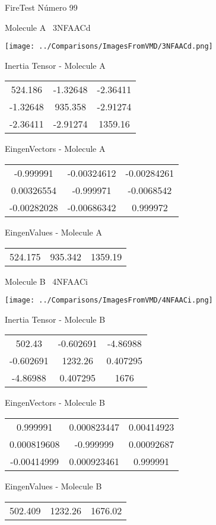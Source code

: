 \vtab[-3cm]
\begin{center}
{\large FireTest \tab Número 99}
\end{center}
\begin{multicols}{2}
\begin{center}

Molecule A \
3NFAACd

\texttt{[image: ../Comparisons/ImagesFromVMD/3NFAACd.png]}

Inertia Tensor - Molecule A \\
\begin{tabular}{|c c c|}
524.186	 & 	-1.32648	 & 	-2.36411	 \\
-1.32648	 & 	935.358	 & 	-2.91274	 \\
-2.36411	 & 	-2.91274	 & 	1359.16
\end{tabular}

\vtab
 EingenVectors - Molecule A     \\
\begin{tabular}{|c c c|}
-0.999991	 & 	-0.00324612	 & 	-0.00284261	 \\
0.00326554	 & 	-0.999971	 & 	-0.0068542	 \\
-0.00282028	 & 	-0.00686342	 & 	0.999972
\end{tabular}

\vtab
 EingenValues - Molecule A     \\
\begin{tabular}{|c c c|}
524.175	 & 	935.342	 & 	1359.19	 \\
\end{tabular}
\columnbreak

Molecule B \
4NFAACi

\texttt{[image: ../Comparisons/ImagesFromVMD/4NFAACi.png]}

Inertia Tensor - Molecule B \\
\begin{tabular}{|c c c|}
502.43	 & 	-0.602691	 & 	-4.86988	 \\
-0.602691	 & 	1232.26	 & 	0.407295	 \\
-4.86988	 & 	0.407295	 & 	1676
\end{tabular}

\vtab
 EingenVectors - Molecule B     \\
\begin{tabular}{|c c c|}
0.999991	 & 	0.000823447	 & 	0.00414923	 \\
0.000819608	 & 	-0.999999	 & 	0.00092687	 \\
-0.00414999	 & 	0.000923461	 & 	0.999991
\end{tabular}

\vtab
 EingenValues - Molecule B     \\
\begin{tabular}{|c c c|}
502.409	 & 	1232.26	 & 	1676.02	 \\
\end{tabular}

\end{center}
\end{multicols}

